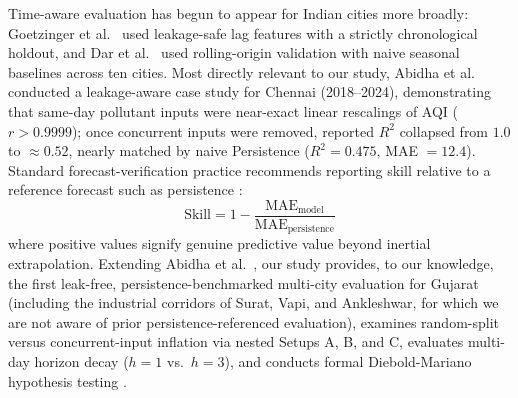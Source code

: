 Time-aware evaluation has begun to appear for Indian cities more broadly: Goetzinger et al.~\cite{goetzinger2026} used leakage-safe lag features with a strictly chronological holdout, and Dar et al.~\cite{dar2025} used rolling-origin validation with naive seasonal baselines across ten cities. Most directly relevant to our study, Abidha et al.~\cite{abidha2026} conducted a leakage-aware case study for Chennai (2018--2024), demonstrating that same-day pollutant inputs were near-exact linear rescalings of AQI ($r > 0.9999$); once concurrent inputs were removed, reported $R^2$ collapsed from $1.0$ to $\approx 0.52$, nearly matched by naive Persistence ($R^2 = 0.475$, MAE $= 12.4$). Standard forecast-verification practice recommends reporting skill relative to a reference forecast such as persistence \cite{murphy1992}\cite{jolliffe2012}:
\begin{equation}
  \text{Skill} = 1 - \frac{\text{MAE}_{\text{model}}}{\text{MAE}_{\text{persistence}}}
  \label{eq:skill_def}
\end{equation}
where positive values signify genuine predictive value beyond inertial extrapolation. Extending Abidha et al.~\cite{abidha2026}, our study provides, to our knowledge, the first leak-free, persistence-benchmarked multi-city evaluation for Gujarat (including the industrial corridors of Surat, Vapi, and Ankleshwar, for which we are not aware of prior persistence-referenced evaluation), examines random-split versus concurrent-input inflation via nested Setups A, B, and C, evaluates multi-day horizon decay ($h=1$ vs.\ $h=3$), and conducts formal Diebold-Mariano hypothesis testing \cite{diebold1995}.

